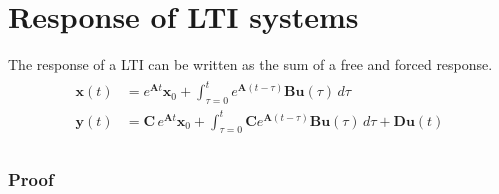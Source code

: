 \documentclass[letterpaper,10pt,english]{jupyterBook}
\begin{document}
\section{Response of LTI systems}
\label{\detokenize{ch/system-theory/lti-response:response-of-lti-systems}}\label{\detokenize{ch/system-theory/lti-response:ode-lti-response-general}}
\sphinxAtStartPar
The response of a LTI can be written as the sum of a free and forced response.
\begin{equation}\label{equation:ch/system-theory/lti-response:eq:lagrange:formula}
\begin{split}\begin{aligned}
  \mathbf{x}(t) & = e^{\mathbf{A} t} \mathbf{x}_0 + \int_{\tau=0}^{t} e^{\mathbf{A}(t-\tau)} \mathbf{B} \mathbf{u}(\tau) \, d \tau \\
  \mathbf{y}(t) & = \mathbf{C} \, e^{\mathbf{A} t} \mathbf{x}_0 + \int_{\tau=0}^{t} \mathbf{C} e^{\mathbf{A}(t-\tau)} \mathbf{B} \mathbf{u}(\tau) \, d \tau + \mathbf{D} \mathbf{u}(t) \\
\end{aligned}\end{split}
\end{equation}\subsubsection*{Proof}

\sphinxAtStartPar
{}
\end{document}
